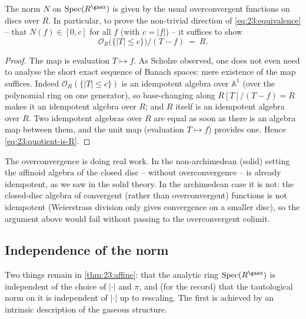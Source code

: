 \begin{proposition}
\label{prop:23:conclusion-norm}
The norm $N$ on $\operatorname{Spec}(R^\gasx)$ is given by the usual
overconvergent functions on discs over $R$. In particular, to prove the
non-trivial direction of \eqref{eq:23:equivalence} -- that
$N(f)\in[0,c]$ for all $f$ (with $c=\lvert f\rvert$) -- it suffices to show
\begin{equation}
\label{eq:23:quotient-is-R}
\mathcal O_R\bigl(\{\lvert T\rvert\le c\}\bigr)\big/(T-f)\ =\ R .
\end{equation}
\end{proposition}

\begin{proof}
The map is evaluation $T\mapsto f$. As Scholze observed, one does not even need
to analyse the short exact sequence of Banach spaces: mere existence of the map
suffices. Indeed $\mathcal O_R(\{\lvert T\rvert\le c\})$ is an idempotent algebra
over $\mathbb A^1$ (over the polynomial ring on one generator), so base-changing
along $R[T]/(T-f)=R$ makes it an idempotent algebra over $R$; and $R$ itself is an
idempotent algebra over $R$. Two idempotent algebras over $R$ are equal as soon
as there is an algebra map between them, and the unit map (evaluation $T\mapsto
f$) provides one. Hence \eqref{eq:23:quotient-is-R}.
\end{proof}

\begin{remark}
\label{rmk:23:overconvergence-essential}
The overconvergence is doing real work. In the non-archimedean (solid) setting
the affinoid algebra of the closed disc -- without overconvergence -- is
already idempotent, as we saw in the solid theory. In the archimedean case it is
not: the closed-disc algebra of convergent (rather than overconvergent) functions
is not idempotent (Weierstrass division only gives convergence on a smaller
disc), so the argument above would fail without passing to the overconvergent
colimit.
\end{remark}

\subsection{Independence of the norm}
\label{subsec:23:independence}

Two things remain in \cref{thm:23:affine}: that the analytic ring
$\operatorname{Spec}(R^\gasx)$ is independent of the choice of $\lvert\cdot\rvert$
and $\pi$, and (for the record) that the tautological norm on it is independent
of $\lvert\cdot\rvert$ up to rescaling. The first is achieved by an intrinsic
description of the gaseous structure.

